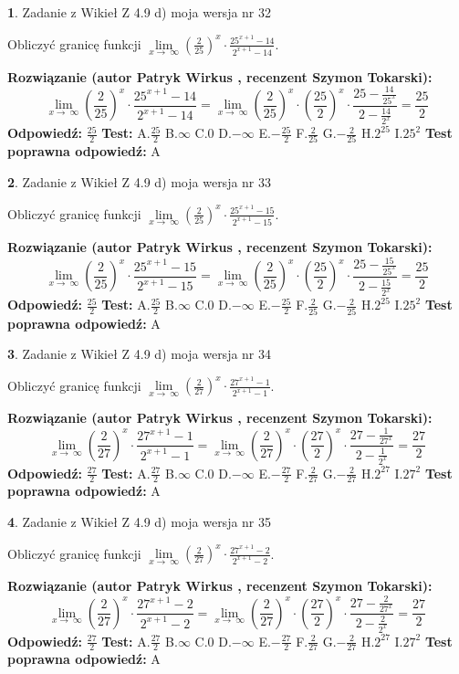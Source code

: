 \documentclass[12pt, a4paper]{article}
\theoremstyle{definition} %
\newtheorem{zad}{}
\newcommand{\zadStart}[1]{\begin{zad}#1\newline}
\newcommand{\zadStop}{\end{zad}}
\newcommand{\rozwStart}[2]{\noindent \textbf{Rozwiązanie (autor #1 , recenzent #2): }\newline}
\newcommand{\rozwStop}{\newline}
\newcommand{\odpStart}{\noindent \textbf{Odpowiedź:}\newline}
\newcommand{\odpStop}{\newline}
\newcommand{\testStart}{\noindent \textbf{Test:}\newline}
\newcommand{\testStop}{\newline}
\newcommand{\kluczStart}{\noindent \textbf{Test poprawna odpowiedź:}\newline}
\newcommand{\kluczStop}{\newline}
\begin{document}
\zadStart{Zadanie z Wikieł Z 4.9 d) moja wersja nr 32}


Obliczyć granicę funkcji  $\lim\limits_{x\to\ \infty}(\frac{2}{25})^{x}\cdot\frac{25^{x+1}-14}{2^{x+1}-14}$.
\zadStop
\rozwStart{Patryk Wirkus}{Szymon Tokarski}
$$\lim\limits_{x\to\ \infty}(\frac{2}{25})^{x}\cdot\frac{25^{x+1}-14}{2^{x+1}-14}=\lim\limits_{x\to\ \infty}(\frac{2}{25})^{x}\cdot(\frac{25}{2})^{x} \cdot \frac{25-\frac{14}{25^{x}}}{2-\frac{14}{2^{x}}} = \frac{25}{2}$$
\rozwStop
\odpStart
$\frac{25}{2}$
\odpStop
\testStart
A.$\frac{25}{2}$ B.$\infty$ C.$0$ D.$-\infty$ E.$-\frac{25}{2}$
F.$\frac{2}{25}$ G.$-\frac{2}{25}$
H.$2^{25}$
I.$25^{2}$
\testStop
\kluczStart
A
\kluczStop



\zadStart{Zadanie z Wikieł Z 4.9 d) moja wersja nr 33}


Obliczyć granicę funkcji  $\lim\limits_{x\to\ \infty}(\frac{2}{25})^{x}\cdot\frac{25^{x+1}-15}{2^{x+1}-15}$.
\zadStop
\rozwStart{Patryk Wirkus}{Szymon Tokarski}
$$\lim\limits_{x\to\ \infty}(\frac{2}{25})^{x}\cdot\frac{25^{x+1}-15}{2^{x+1}-15}=\lim\limits_{x\to\ \infty}(\frac{2}{25})^{x}\cdot(\frac{25}{2})^{x} \cdot \frac{25-\frac{15}{25^{x}}}{2-\frac{15}{2^{x}}} = \frac{25}{2}$$
\rozwStop
\odpStart
$\frac{25}{2}$
\odpStop
\testStart
A.$\frac{25}{2}$ B.$\infty$ C.$0$ D.$-\infty$ E.$-\frac{25}{2}$
F.$\frac{2}{25}$ G.$-\frac{2}{25}$
H.$2^{25}$
I.$25^{2}$
\testStop
\kluczStart
A
\kluczStop



\zadStart{Zadanie z Wikieł Z 4.9 d) moja wersja nr 34}


Obliczyć granicę funkcji  $\lim\limits_{x\to\ \infty}(\frac{2}{27})^{x}\cdot\frac{27^{x+1}-1}{2^{x+1}-1}$.
\zadStop
\rozwStart{Patryk Wirkus}{Szymon Tokarski}
$$\lim\limits_{x\to\ \infty}(\frac{2}{27})^{x}\cdot\frac{27^{x+1}-1}{2^{x+1}-1}=\lim\limits_{x\to\ \infty}(\frac{2}{27})^{x}\cdot(\frac{27}{2})^{x} \cdot \frac{27-\frac{1}{27^{x}}}{2-\frac{1}{2^{x}}} = \frac{27}{2}$$
\rozwStop
\odpStart
$\frac{27}{2}$
\odpStop
\testStart
A.$\frac{27}{2}$ B.$\infty$ C.$0$ D.$-\infty$ E.$-\frac{27}{2}$
F.$\frac{2}{27}$ G.$-\frac{2}{27}$
H.$2^{27}$
I.$27^{2}$
\testStop
\kluczStart
A
\kluczStop



\zadStart{Zadanie z Wikieł Z 4.9 d) moja wersja nr 35}


Obliczyć granicę funkcji  $\lim\limits_{x\to\ \infty}(\frac{2}{27})^{x}\cdot\frac{27^{x+1}-2}{2^{x+1}-2}$.
\zadStop
\rozwStart{Patryk Wirkus}{Szymon Tokarski}
$$\lim\limits_{x\to\ \infty}(\frac{2}{27})^{x}\cdot\frac{27^{x+1}-2}{2^{x+1}-2}=\lim\limits_{x\to\ \infty}(\frac{2}{27})^{x}\cdot(\frac{27}{2})^{x} \cdot \frac{27-\frac{2}{27^{x}}}{2-\frac{2}{2^{x}}} = \frac{27}{2}$$
\rozwStop
\odpStart
$\frac{27}{2}$
\odpStop
\testStart
A.$\frac{27}{2}$ B.$\infty$ C.$0$ D.$-\infty$ E.$-\frac{27}{2}$
F.$\frac{2}{27}$ G.$-\frac{2}{27}$
H.$2^{27}$
I.$27^{2}$
\testStop
\kluczStart
A
\kluczStop
\end{document}
